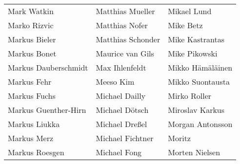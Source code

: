 \begin{tabular}{p{4.5cm}p{4.5cm}p{4.5cm}}
Mark Watkin & Matthias Mueller & Mikael Lund \\
Marko Rizvic & Matthias Nofer & Mike Betz \\
Markus Bieler & Matthias Schonder & Mike Kastrantas \\
Markus Bonet & Maurice van Gils & Mike Pikowski \\
Markus Dauberschmidt & Max Ihlenfeldt & Mikko Hämäläinen \\
Markus Fehr & Meeso Kim & Mikko Suontausta \\
Markus Fuchs & Michael Dailly & Mirko Roller \\
Markus Guenther-Hirn & Michael Dötsch & Miroslav Karkus \\
Markus Liukka & Michael Dreßel & Morgan Antonsson \\
Markus Merz & Michael Fichtner & Moritz \\
Markus Roesgen & Michael Fong & Morten Nielsen \\
\end{tabular}
\newpage
\setlength{\tabcolsep}{1mm}
